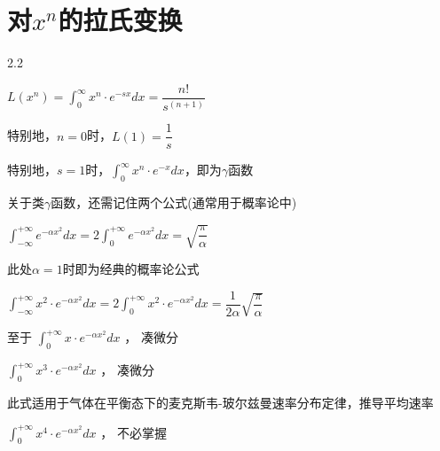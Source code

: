 \section{对$x^{n}$的拉氏变换}

\begin{spacing}{2.2}
	\begin{center}
		$L\left(x^{n}\right)=\int_{0}^{\infty}x^{n}\cdot e^{-sx}dx=\dfrac{n!}{s^{\left(n+1\right)}}$
		
		特别地，$n=0$时，$L\left(1\right)=\dfrac{1}{s}$ 
		
		特别地，$s=1$时，$\int_{0}^{\infty}x^{n}\cdot e^{-x}dx$，即为$\gamma$函数
		
		关于类$\gamma$函数，还需记住两个公式(通常用于概率论中)
		
		$\int_{-\infty}^{+\infty}e^{-\alpha x^{2}}dx=2\int_{0}^{+\infty}e^{-\alpha x^{2}}dx=\sqrt{\dfrac{\pi}{\alpha}}$  
		
		此处$\alpha=1$时即为经典的概率论公式
		
		$\int_{-\infty}^{+\infty}x^{2}\cdot e^{-\alpha x^{2}}dx=2\int_{0}^{+\infty}x^{2}\cdot e^{-\alpha x^{2}}dx=\dfrac{1}{2\alpha}\sqrt{\dfrac{\pi}{\alpha}}$
		
		至于 \hspace{1em} $\int_{0}^{+\infty}x\cdot e^{-\alpha x^{2}}dx$ ，\hspace{0.5em} 凑微分
		
		\hspace{3em} $\int_{0}^{+\infty}x^{3}\cdot e^{-\alpha x^{2}}dx$ ，\hspace{0.5em} 凑微分
		
		此式适用于气体在平衡态下的麦克斯韦-玻尔兹曼速率分布定律，推导平均速率
		
		\hspace{3em} $\int_{0}^{+\infty}x^{4}\cdot e^{-\alpha x^{2}}dx$ ，\hspace{0.5em} 不必掌握
	\end{center}
\end{spacing}

















